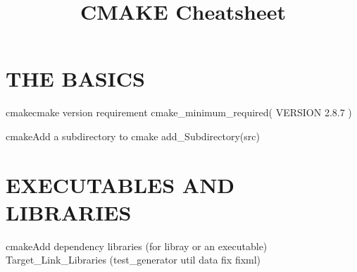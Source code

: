 \documentclass[10pt,a4paper]{article}
\title{\color{w3schools}CMAKE Cheatsheet
}
\begin{document}
\maketitle
\small
\begin{multicols}{3}

\thispagestyle{empty}
\scriptsize

% 




{\centering\section{THE BASICS}}

\begin{codebox}{cmake}{cmake version requirement}
cmake_minimum_required( VERSION 2.8.7 )

\end{codebox}

\begin{codebox}{cmake}{Add a subdirectory to cmake}
add_Subdirectory(src)

\end{codebox}

{\centering\section{EXECUTABLES AND LIBRARIES}}


\begin{codebox}{cmake}{Add dependency libraries (for libray or an executable)}
Target_Link_Libraries (test_generator
	util data fix fixml)


\end{codebox}
\end{multicols}
\end{document}
